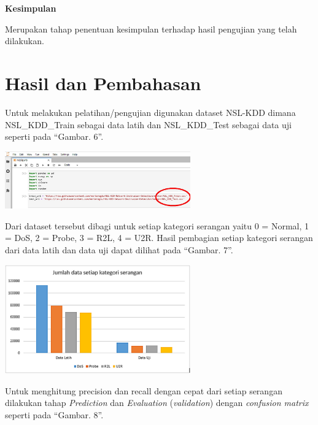 \documentclass[conference]{IEEEtran}
\begin{document}
\noindent \textbf{Kesimpulan}

Merupakan tahap penentuan kesimpulan terhadap hasil pengujian yang telah dilakukan.

\section{Hasil dan Pembahasan}

Untuk melakukan pelatihan/pengujian digunakan dataset NSL-KDD dimana NSL\_KDD\_Train sebagai data latih dan NSL\_KDD\_Test sebagai data uji seperti pada ``Gambar. 6''\cite{mamcose}.\vspace{6pt}

\begin{minipage}{\linewidth}
\centerline{\includegraphics[width=80mm]{Gambar/Gbr01.jpg}}
\label{fig6}
\end{minipage}
\vspace{6pt}

Dari dataset tersebut dibagi untuk setiap kategori serangan
yaitu 0 = Normal, 1 = DoS, 2 = Probe, 3 = R2L, 4 = U2R.
Hasil pembagian setiap kategori serangan dari data latih dan data uji dapat dilihat pada ``Gambar. 7''.\vspace{6pt}

\begin{minipage}{\linewidth}
    \centerline{\includegraphics[width=80mm]{Gambar/Gbr011.jpg}}
    \label{fig7}
    \end{minipage}
    \vspace{6pt}

Untuk menghitung precision dan recall dengan cepat dari setiap serangan dilakukan
tahap \emph{Prediction} dan \emph{Evaluation} (\emph{validation}) dengan \emph{confusion matrix}
seperti pada ``Gambar. 8''.
\end{document}
